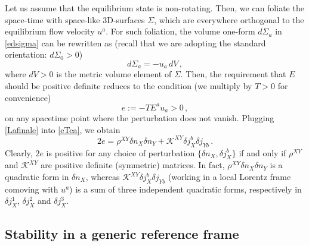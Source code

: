 \documentclass[a4paper, amsfonts, amssymb, amsmath, reprint, showkeys, nofootinbib, twoside, onecolumn,notitlepage]{revtex4-1}
\theoremstyle{definition}
\theoremstyle{theorem}
\begin{document}
Let us assume that the equilibrium state is non-rotating. Then, we can foliate the space-time with space-like 3D-surfaces $\Sigma$, which are everywhere orthogonal to the equilibrium flow velocity $u^a$. For such foliation, the volume one-form $d\Sigma_a$ in \eqref{edsigma} can be rewritten as (recall that we are adopting the standard orientation: $d\Sigma_0>0$)
\begin{equation}
d\Sigma_a = -u_a \, dV \, ,
\end{equation}
where $dV>0$ is the metric volume element of $\Sigma$. Then, the requirement that $E$ should be positive definite reduces to the condition (we multiply by $T>0$ for convenience) 
\begin{equation}\label{eTea}
e := -T E^a u_a >0 \, , 
\end{equation}
on any spacetime point where the perturbation does not vanish. Plugging \eqref{Lafinale} into \eqref{eTea}, we obtain
\begin{equation}
2e =  \rho^{XY} \delta n_X \delta n_Y + \mathcal{K}^{XY} \delta j_X^b \delta j_{Yb} \, .
\end{equation}
Clearly, $2e$ is positive for any choice of perturbation $\{ \delta n_X , \delta j_X^b \}$ if and only if $\rho^{XY}$ and $\mathcal{K}^{XY}$ are positive definite (symmetric) matrices. In fact, $\rho^{XY} \delta n_X \delta n_Y$ is a quadratic form in $\delta n_X$, whereas $\mathcal{K}^{XY} \delta j_X^b \delta j_{Yb}$ (working in a local Lorentz frame comoving with $u^a$) is a sum of three independent quadratic forms, respectively in $\delta j_X^1$, $\delta j_X^2$ and $\delta j_X^3$.


\subsection{Stability in a generic reference frame}
\end{document}
